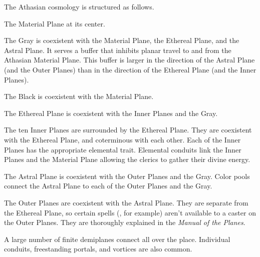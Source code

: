 The Athasian cosmology is structured as follows.
\begin{itemize*}
\item The Material Plane at its center.
\item The Gray is coexistent with the Material Plane, the Ethereal Plane, and the Astral Plane. It serves a buffer that inhibits planar travel to and from the Athasian Material Plane. This buffer is larger in the direction of the Astral Plane (and the Outer Planes) than in the direction of the Ethereal Plane (and the Inner Planes).
\item The Black is coexistent with the Material Plane.
\item The Ethereal Plane is coexistent with the Inner Planes and the Gray.
\item The ten Inner Planes are surrounded by the Ethereal Plane. They are coexistent with the Ethereal Plane, and coterminous with each other. Each of the Inner Planes has the appropriate elemental trait. Elemental conduits link the Inner Planes and the Material Plane allowing the clerics to gather their divine energy.
\item The Astral Plane is coexistent with the Outer Planes and the Gray. Color pools connect the Astral Plane to each of the Outer Planes and the Gray.


\item The Outer Planes are coexistent with the Astral Plane. They are separate from the Ethereal Plane, so certain spells (, for example) aren't available to a caster on the Outer Planes. They are thoroughly explained in the \emph{Manual of the Planes}.
\end{itemize*}

A large number of finite demiplanes connect all over the place. Individual conduits, freestanding portals, and vortices are also common.
